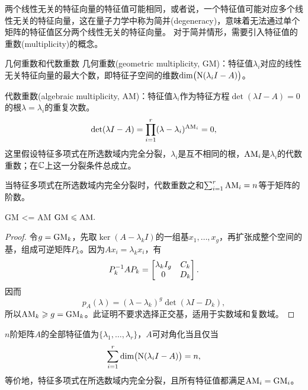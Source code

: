 两个线性无关的特征向量的特征值可能相同，或者说，一个特征值可能对应多个线性无关的特征向量，这在量子力学中称为简并(degeneracy)，意味着无法通过单个矩阵的特征值区分两个线性无关的特征向量。
对于简并情形，需要引入特征值的重数(multiplicity)的概念。

\begin{definition}{几何重数和代数重数}{}
	几何重数(geometric multiplicity, GM)：特征值$\lambda_i$对应的线性无关特征向量的最大个数，即特征子空间的维数$\dim\bigl(\operatorname{N}(\lambda_iI - A)\bigr)$。

	代数重数(algebraic multiplicity, AM)：特征值$\lambda_i$作为特征方程$\det(\lambda I - A) = 0$的根$\lambda = \lambda_i$的重复次数。
	\begin{equation}\label{eq:la-characteristic-multiplicities}
		\det(\lambda I - A) = \prod_{i=1}^r(\lambda - \lambda_i)^{\mathrm{AM}_i} = 0,
	\end{equation}
	这里假设特征多项式在所选数域内完全分裂，$\lambda_i$是互不相同的根，$\mathrm{AM}_i$是$\lambda_i$的代数重数；在$\mathbb{C}$上这一分裂条件总成立。
\end{definition}

\begin{corollary}
	当特征多项式在所选数域内完全分裂时，代数重数之和$\textstyle\sum_{i=1}^r\mathrm{AM}_i = n$等于矩阵的阶数。
\end{corollary}

\begin{theorem}{}{GM <= AM}
	$\mathrm{GM} \leqslant \mathrm{AM}.$
\end{theorem}
\begin{proof}
    令$g = \mathrm{GM}_k$，先取$\ker(A - \lambda_k I)$的一组基$x_1,\ldots,x_g$，再扩张成整个空间的基，组成可逆矩阵$P_k$。因为$Ax_i = \lambda_kx_i$，有
	\[
        P_k^{-1} AP_k = \begin{bmatrix}
            \lambda_k I_g&C_k\\0&D_k
        \end{bmatrix}.
	\]
    因而
	\[
        p_A(\lambda) = (\lambda - \lambda_k)^g\det(\lambda I - D_k),
	\]
    所以$\mathrm{AM}_k \geqslant g = \mathrm{GM}_k$。此证明不要求选择正交基，适用于实数域和复数域。
\end{proof}

\begin{corollary}
	$n$阶矩阵$A$的全部特征值为$\{\lambda_1,\ldots,\lambda_r\}$，$A$可对角化当且仅当
	\begin{equation}\label{eq:la-diagonalization-eigenspaces}
		\sum_{i=1}^r\dim\bigl(\operatorname{N}(\lambda_iI - A)\bigr) = n,
	\end{equation}
	等价地，特征多项式在所选数域内完全分裂，且所有特征值都满足$\mathrm{AM}_i = \mathrm{GM}_i$。
\end{corollary}

